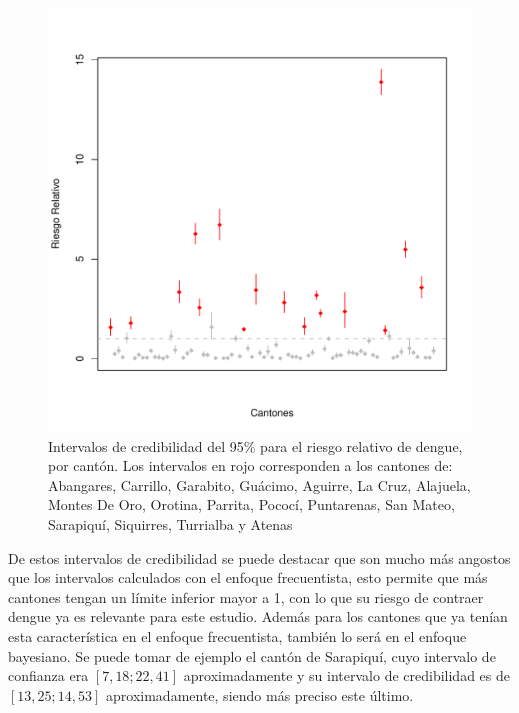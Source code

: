\documentclass[a4paper,12pt]{report}
\begin{document}
\begin{figure}[hbtp]
\centering
\includegraphics[scale=0.55]{FF1.pdf}
\caption{Intervalos de credibilidad del 95\% para el riesgo relativo de dengue, por cantón. Los intervalos en rojo corresponden a los cantones de: Abangares, Carrillo, Garabito, Guácimo, Aguirre, La Cruz, Alajuela, Montes De Oro, Orotina, Parrita, Pococí, Puntarenas, San Mateo, Sarapiquí, Siquirres, Turrialba y Atenas}
\end{figure}
De estos intervalos de credibilidad se puede destacar que son mucho más angostos que los intervalos calculados con el enfoque frecuentista, esto permite que más cantones tengan un límite inferior mayor a 1, con lo que su riesgo de contraer dengue ya es relevante para este estudio. Además para los cantones que ya tenían esta característica  en el enfoque frecuentista, también lo será en el enfoque bayesiano. Se puede tomar de ejemplo el cantón de Sarapiquí, cuyo intervalo de confianza era $[7,18; 22,41]$ aproximadamente y su intervalo de credibilidad es de $[13,25; 14,53]$ aproximadamente, siendo más preciso este último.
\newpage
\end{document}
